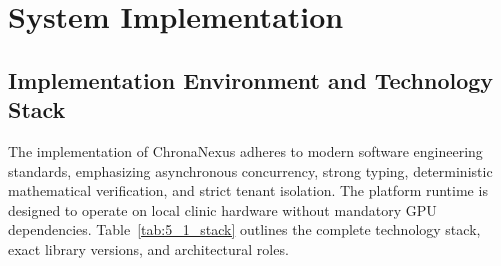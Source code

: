 \chapter{System Implementation}
\label{chap:implementation}

\section{Implementation Environment and Technology Stack}
\label{sec:impl_env}

The implementation of ChronaNexus adheres to modern software engineering standards, emphasizing asynchronous concurrency, strong typing, deterministic mathematical verification, and strict tenant isolation. The platform runtime is designed to operate on local clinic hardware without mandatory GPU dependencies. Table~\ref{tab:5_1_stack} outlines the complete technology stack, exact library versions, and architectural roles.

